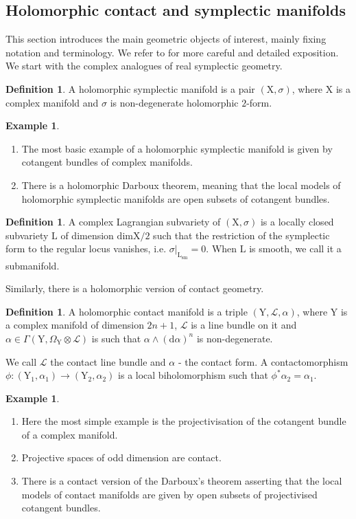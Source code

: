 \documentclass{article}
\theoremstyle{plain}
\theoremstyle{definition}
\newtheorem{definition}[theorem]{Definition}
\newtheorem{example}[theorem]{Example}
\theoremstyle{remark}
\newcommand{\mr}{\mathrm}
\newcommand{\3}{\vspace{3mm}}
\newcommand{\2}{\vspace{2mm}}
\newcommand{\1}{\vspace{1mm}}
\begin{document}
\subsection{Holomorphic contact and symplectic manifolds}
This section introduces the main geometric objects of interest, mainly fixing notation and terminology. We refer to \cite{saf} for more careful and detailed exposition. We start with the complex analogues of real symplectic geometry.
\2
\begin{definition}
A holomorphic symplectic manifold is a pair $(\mr{X},\sigma)$, where $\mr{X}$ is a complex manifold and $\sigma$ is non-degenerate holomorphic $2$-form. 
\end{definition}
\2
\begin{example}
\begin{enumerate}
\item The most basic example of a holomorphic symplectic manifold is given by cotangent bundles of complex manifolds. 
\item There is a holomorphic Darboux theorem, meaning that the local models of holomorphic symplectic manifolds are open subsets of cotangent bundles.
\end{enumerate}
\end{example}
\2
\begin{definition}
A complex Lagrangian subvariety of $(\mr{X},\sigma)$ is a locally closed subvariety $\mr{L}$ of dimension $\mr{dim}\mr{X}/2$ such that the restriction of the symplectic form to the regular locus vanishes, i.e. $\sigma|_{\mr{L}_{\mr{sm}}}=0$. When $\mr{L}$ is smooth, we call it a submanifold.
\end{definition}
Similarly, there is a holomorphic version of contact geometry.
\2
\begin{definition}
A holomorphic contact manifold is a triple $(\mr{Y},\mathscr{L},\alpha)$, where $\mr{Y}$ is a complex manifold of dimension $2n+1$, $\mathscr{L}$ is a line bundle on it and $\alpha \in \Gamma(\mr{Y},\Omega_\mr{Y}\otimes \mathscr{L})$ is such that $\alpha\wedge(\mr{d}\alpha)^n$ is non-degenerate.
\end{definition}
We call $\mathscr{L}$ the contact line bundle and $\alpha$ - the contact form. A contactomorphism $\phi :(\mr{Y}_1,\alpha_1) \to (\mr{Y}_2,\alpha_2)$ is a local biholomorphism such that $\phi^*\alpha_2=\alpha_1$. 
\2
\begin{example}
\begin{enumerate}
\item Here the most simple example is the projectivisation of the cotangent bundle of a complex manifold. 
\item Projective spaces of odd dimension are contact.
\item There is a contact version of the Darboux's theorem asserting that the local models of contact manifolds are given by open subsets of projectivised cotangent bundles.
\end{enumerate}
\end{example}
\end{document}
